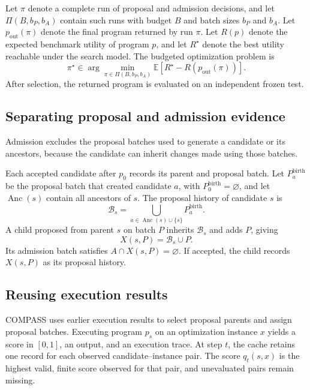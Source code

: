 Let $\pi$ denote a complete run of proposal and admission decisions, and let
$\Pi(B,b_P,b_A)$ contain such runs with budget $B$ and batch sizes $b_P$ and
$b_A$.  Let
$p_{\mathrm{out}}(\pi)$ denote the final program returned by run $\pi$.
Let $R(p)$ denote the expected benchmark utility of program $p$, and let
$R^\star$ denote the best utility reachable under the search model.  The
budgeted optimization problem is
\[
\pi^\star\in
\arg\min_{\pi\in\Pi(B,b_P,b_A)}
\mathbb{E}\!\left[
R^\star-R\!\left(p_{\mathrm{out}}(\pi)\right)
\right].
\]
After selection, the returned program is evaluated on an independent frozen
test.

\subsection{Separating proposal and admission evidence}

Admission excludes the proposal batches used to generate a candidate or its
ancestors, because the candidate can inherit changes made using those batches.

Each accepted candidate after $p_0$ records its parent and proposal batch.  Let
$P_a^{\mathrm{birth}}$ be the proposal batch that created candidate $a$, with
$P_0^{\mathrm{birth}}=\varnothing$, and let $\operatorname{Anc}(s)$ contain all
ancestors of $s$.  The proposal history of candidate $s$ is
\[
\mathcal B_s=\bigcup_{a\in\operatorname{Anc}(s)\cup\{s\}}
P_a^{\mathrm{birth}}.
\]
A child proposed from parent $s$ on batch $P$ inherits $\mathcal B_s$ and adds
$P$, giving
\begin{equation}
X(s,P)=\mathcal B_s\cup P.
\label{eq:recursive_exclusion}
\end{equation}
Its admission batch satisfies $A\cap X(s,P)=\varnothing$.  If accepted, the
child records $X(s,P)$ as its proposal history.

\subsection{Reusing execution results}

COMPASS uses earlier execution results to select proposal parents and assign
proposal batches.  Executing program $p_s$ on an optimization instance $x$
yields a score in $[0,1]$, an output, and an execution trace.  At step $t$, the
cache retains one record for each observed
candidate--instance pair.  The score $q_t(s,x)$ is the highest valid, finite
score observed for that pair, and unevaluated pairs remain missing.

